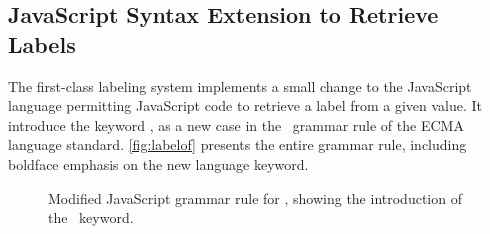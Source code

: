 \subsection{JavaScript Syntax Extension to Retrieve Labels}

The first-class labeling system implements a small change to the JavaScript language permitting JavaScript code to retrieve a label from a given value.
It introduce the keyword \mlabelof, as a new case in the \UnaryExpression\ grammar rule of the ECMA~\cite{ecma} language standard.
\autoref{fig:labelof} presents the entire grammar rule, including boldface emphasis on the new language keyword.

\begin{figure}[ht]
  \centering
{}
  \caption{Modified JavaScript grammar rule for \UnaryExpression, showing the introduction of the \mlabelof\ keyword.}
  \label{fig:labelof}
\end{figure}
\vspace*{-\baselineskip}

